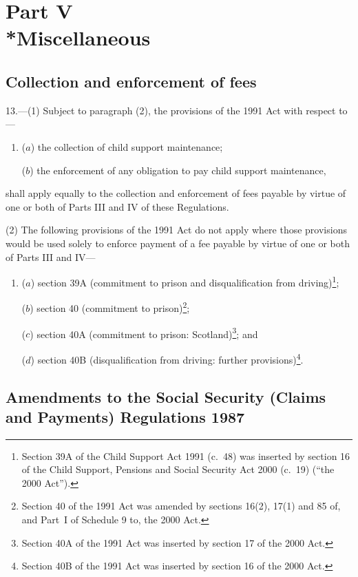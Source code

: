 \documentclass[12pt,a4paper]{article}
\begin{document}
\section[Part V --- Miscellaneous]{Part V\\*Miscellaneous}

\renewcommand\parthead{--- Part V}

\subsection[13. Collection and enforcement of fees]{Collection and enforcement of fees}

13.—(1) Subject to paragraph (2), the provisions of the 1991 Act with respect to—
\begin{enumerate}\item[]
($a$) the collection of child support maintenance;

($b$) the enforcement of any obligation to pay child support maintenance,
\end{enumerate}
shall apply equally to the collection and enforcement of fees payable by virtue of one or both of Parts III and IV of these Regulations.

(2) The following provisions of the 1991 Act do not apply where those provisions would be used solely to enforce payment of a fee payable by virtue of one or both of Parts III and IV—
\begin{enumerate}\item[]
($a$) section 39A (commitment to prison and disqualification from driving)\footnote{Section 39A of the Child Support Act 1991 (c.~48) was inserted by section 16 of the Child Support, Pensions and Social Security Act 2000 (c.~19) (“the 2000 Act”).};

($b$) section 40 (commitment to prison)\footnote{Section 40 of the 1991 Act was amended by sections 16(2), 17(1) and 85 of, and Part~I of Schedule 9 to, the 2000 Act.};

($c$) section 40A (commitment to prison: Scotland)\footnote{Section 40A of the 1991 Act was inserted by section 17 of the 2000 Act.}; and

($d$) section 40B (disqualification from driving: further provisions)\footnote{Section 40B of the 1991 Act was inserted by section 16 of the 2000 Act.}.
\end{enumerate}

\subsection[14. Amendments to the Social Security (Claims and Payments) Regulations 1987]{Amendments to the Social Security (Claims and Payments) Regulations 1987}
\end{document}
